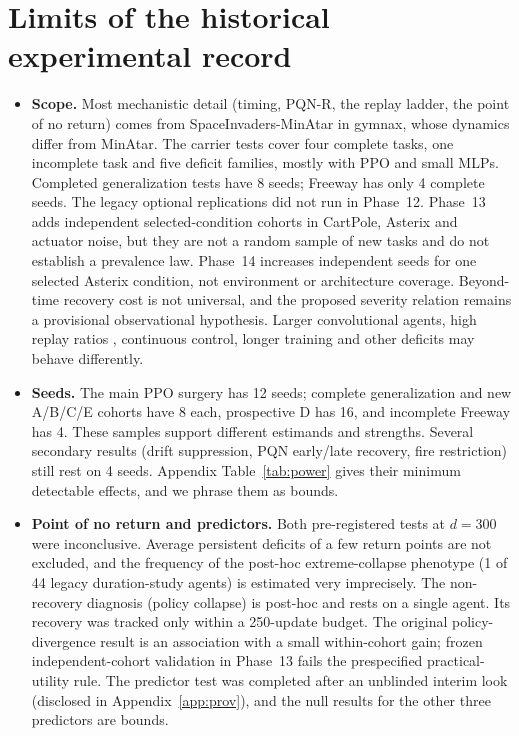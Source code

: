 \documentclass[10pt]{article} %
\begin{document}
\section{Limits of the historical experimental record}\label{sec:limits}
\begin{itemize}
\item \textbf{Scope.} Most mechanistic detail (timing, PQN-R, the replay ladder, the point of no return) comes from SpaceInvaders-MinAtar in gymnax, whose dynamics differ from MinAtar. The carrier tests cover four complete tasks, one incomplete task and five deficit families, mostly with PPO and small MLPs. Completed generalization tests have 8 seeds; Freeway has only 4 complete seeds. The legacy optional replications did not run in Phase~12. Phase~13 adds independent selected-condition cohorts in CartPole, Asterix and actuator noise, but they are not a random sample of new tasks and do not establish a prevalence law. Phase~14 increases independent seeds for one selected Asterix condition, not environment or architecture coverage. Beyond-time recovery cost is not universal, and the proposed severity relation remains a provisional observational hypothesis. Larger convolutional agents, high replay ratios \citep{schwarzer2023bbf}, continuous control, longer training and other deficits may behave differently.
\item \textbf{Seeds.} The main PPO surgery has 12 seeds; complete generalization and new A/B/C/E cohorts have 8 each, prospective D has 16, and incomplete Freeway has 4. These samples support different estimands and strengths. Several secondary results (drift suppression, PQN early/late recovery, fire restriction) still rest on 4 seeds. Appendix Table~\ref{tab:power} gives their minimum detectable effects, and we phrase them as bounds.
\item \textbf{Point of no return and predictors.} Both pre-registered tests at $d=300$ were inconclusive. Average persistent deficits of a few return points are not excluded, and the frequency of the post-hoc extreme-collapse phenotype (1 of 44 legacy duration-study agents) is estimated very imprecisely. The non-recovery diagnosis (policy collapse) is post-hoc and rests on a single agent. Its recovery was tracked only within a 250-update budget. The original policy-divergence result is an association with a small within-cohort gain; frozen independent-cohort validation in Phase~13 fails the prespecified practical-utility rule. The predictor test was completed after an unblinded interim look (disclosed in Appendix~\ref{app:prov}), and the null results for the other three predictors are bounds.

\end{itemize}
\end{document}
